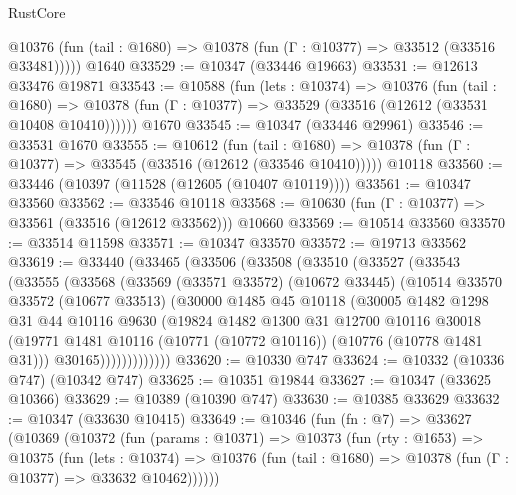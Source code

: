 \begin{lexlean}{RustCore}
\begin{coremodule}
      @10376 (fun (tail : @1680) => @10378 (fun (Γ : @10377) => @33512 (@33516 @33481)))))
    @1640
@33529 := @10347 (@33446 @19663)
@33531 := @12613 @33476 @19871
@33543 := @10588
    (fun (lets : @10374) =>
    @10376
      (fun (tail : @1680) =>
      @10378 (fun (Γ : @10377) => @33529 (@33516 (@12612 (@33531 @10408 @10410))))))
    @1670
@33545 := @10347 (@33446 @29961)
@33546 := @33531 @1670
@33555 := @10612
    (fun (tail : @1680) => @10378 (fun (Γ : @10377) => @33545 (@33516 (@12612 (@33546 @10410)))))
    @10118
@33560 := @33446 (@10397 (@11528 (@12605 (@10407 @10119))))
@33561 := @10347 @33560
@33562 := @33546 @10118
@33568 := @10630 (fun (Γ : @10377) => @33561 (@33516 (@12612 @33562))) @10660
@33569 := @10514 @33560
@33570 := @33514 @11598
@33571 := @10347 @33570
@33572 := @19713 @33562
@33619 := @33440
    (@33465
      (@33506
        (@33508
          (@33510
            (@33527
              (@33543
                (@33555
                  (@33568
                    (@33569
                      (@33571 @33572)
                      (@10672 @33445)
                      (@10514
                        @33570
                        @33572
                        (@10677 @33513)
                        (@30000
                          @1485
                          @45
                          @10118
                          (@30005
                            @1482
                            @1298
                            @31
                            @44
                            @10116
                            @9630
                            (@19824
                              @1482
                              @1300
                              @31
                              @12700
                              @10116
                              @30018
                              (@19771
                                @1481
                                @10116
                                (@10771 (@10772 @10116))
                                (@10776 (@10778 @1481 @31)))
                              @30165)))))))))))))
@33620 := @10330 @747
@33624 := @10332 (@10336 @747) (@10342 @747)
@33625 := @10351 @19844
@33627 := @10347 (@33625 @10366)
@33629 := @10389 (@10390 @747)
@33630 := @10385 @33629
@33632 := @10347 (@33630 @10415)
@33649 := @10346
    (fun (fn : @7) =>
    @33627
      (@10369
        (@10372
          (fun (params : @10371) =>
          @10373
            (fun (rty : @1653) =>
            @10375
              (fun (lets : @10374) =>
              @10376 (fun (tail : @1680) => @10378 (fun (Γ : @10377) => @33632 @10462))))))

\end{coremodule}
\end{lexlean}
